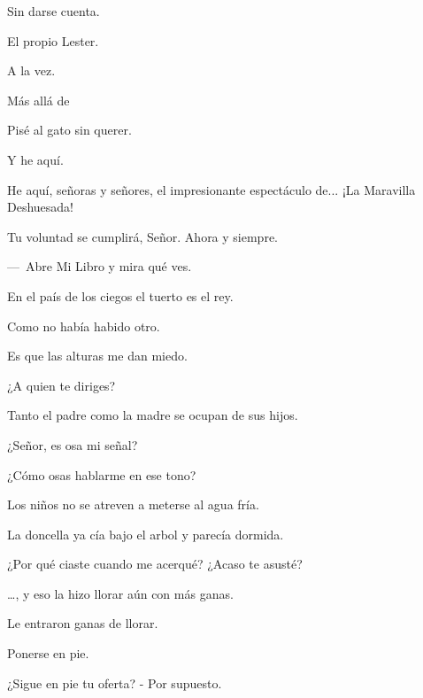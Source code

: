 \sk
Sin darse cuenta. 

\sk
El propio Lester. 

\sk
A la vez. 

\sk
Más allá de 

\sk
Pisé al gato sin querer. 

\sk
Y he aquí. 

\sk
He aquí, señoras y señores, el impresionante espectáculo de... ¡La Maravilla Deshuesada! 

\sk
Tu voluntad se cumplirá, Señor. Ahora y siempre.

\sk
---~Abre Mi Libro y mira qué ves. 

\sk
En el país de los ciegos el tuerto es el rey.

\sk
Como no había habido otro. 

\sk
Es que las alturas me dan miedo. 

\sk
¿A quien te diriges? 

\sk
Tanto el padre como la madre se ocupan de sus hijos. 

\sk
¿Señor, es osa mi señal? \nb{}

\sk
¿Cómo osas hablarme en ese tono? 

\sk
Los niños no se atreven a meterse al agua fría. 

\sk
La doncella ya cía bajo el arbol y parecía dormida. 

\sk
¿Por qué ciaste cuando me acerqué? ¿Acaso te asusté? 

\sk
\ldots{}, y eso la hizo llorar aún con más ganas. 

\sk
Le entraron ganas de llorar. 

\sk
Ponerse en pie. 

\sk
¿Sigue en pie tu oferta? - Por supuesto. 

